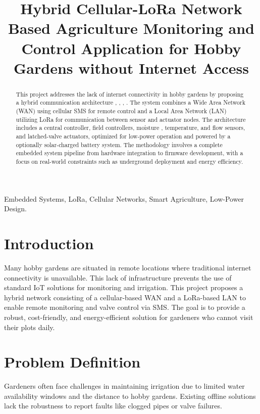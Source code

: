 \documentclass[conference]{IEEEtran}
\begin{document}
\title{Hybrid Cellular-LoRa Network Based Agriculture Monitoring and Control Application for Hobby Gardens without Internet Access}

\author{
}

\maketitle

\begin{abstract}
This project addresses the lack of internet connectivity in hobby gardens by proposing a hybrid communication architecture \cite{enock2025lora}, \cite{heble2018low}, \cite{islam2021performance}, \cite{lorawan2025}. The system combines a Wide Area Network (WAN) using cellular SMS for remote control and a Local Area Network (LAN) utilizing LoRa for communication between sensor and actuator nodes. The architecture includes a central controller, field controllers, moisture \cite{sudan2025}, temperature, and flow sensors, and latched-valve actuators, optimized for low-power operation and powered by a optionally solar-charged battery system. The methodology involves a complete embedded system pipeline from hardware integration to firmware development, with a focus on real-world constraints such as underground deployment and energy efficiency.
\end{abstract}

\begin{IEEEkeywords}
Embedded Systems, LoRa, Cellular Networks, Smart Agriculture, Low-Power Design.
\end{IEEEkeywords}

\section{Introduction}
Many hobby gardens are situated in remote locations where traditional internet connectivity is unavailable. This lack of infrastructure prevents the use of standard IoT solutions for monitoring and irrigation. This project proposes a hybrid network consisting of a cellular-based WAN and a LoRa-based LAN to enable remote monitoring and valve control via SMS. The goal is to provide a robust, cost-friendly, and energy-efficient solution for gardeners who cannot visit their plots daily.

\section{Problem Definition}
Gardeners often face challenges in maintaining irrigation due to limited water availability windows and the distance to hobby gardens. Existing offline solutions lack the robustness to report faults like clogged pipes or valve failures. 
\end{document}
